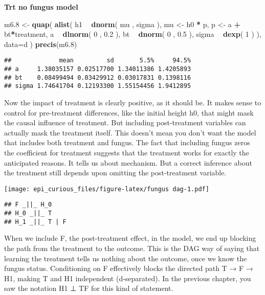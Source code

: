\documentclass[
]{article}
\newenvironment{Shaded}{\begin{snugshade}}{\end{snugshade}}
\newcommand{\DataTypeTok}[1]{\textcolor[rgb]{0.13,0.29,0.53}{#1}}
\newcommand{\DecValTok}[1]{\textcolor[rgb]{0.00,0.00,0.81}{#1}}
\newcommand{\FloatTok}[1]{\textcolor[rgb]{0.00,0.00,0.81}{#1}}
\newcommand{\KeywordTok}[1]{\textcolor[rgb]{0.13,0.29,0.53}{\textbf{#1}}}
\newcommand{\NormalTok}[1]{#1}
\newcommand{\OperatorTok}[1]{\textcolor[rgb]{0.81,0.36,0.00}{\textbf{#1}}}
\newcommand{\StringTok}[1]{\textcolor[rgb]{0.31,0.60,0.02}{#1}}
\begin{document}
\textbf{Trt no fungus model}

\begin{Shaded}
\begin{Highlighting}[]
\NormalTok{m6}\FloatTok{.8}\NormalTok{ <-}\StringTok{ }\KeywordTok{quap}\NormalTok{( }\KeywordTok{alist}\NormalTok{(}
\NormalTok{h1 }\OperatorTok{~}\StringTok{ }\KeywordTok{dnorm}\NormalTok{( mu , sigma ), }
\NormalTok{mu <-}\StringTok{ }\NormalTok{h0 }\OperatorTok{*}\StringTok{ }\NormalTok{p,}
\NormalTok{p <-}\StringTok{ }\NormalTok{a }\OperatorTok{+}\StringTok{ }\NormalTok{bt}\OperatorTok{*}\NormalTok{treatment,}
\NormalTok{a }\OperatorTok{~}\StringTok{ }\KeywordTok{dlnorm}\NormalTok{( }\DecValTok{0}\NormalTok{ , }\FloatTok{0.2}\NormalTok{ ), }
\NormalTok{bt }\OperatorTok{~}\StringTok{ }\KeywordTok{dnorm}\NormalTok{( }\DecValTok{0}\NormalTok{ , }\FloatTok{0.5}\NormalTok{ ), }
\NormalTok{sigma }\OperatorTok{~}\StringTok{ }\KeywordTok{dexp}\NormalTok{( }\DecValTok{1}\NormalTok{ )}
\NormalTok{), }\DataTypeTok{data=}\NormalTok{d ) }
\KeywordTok{precis}\NormalTok{(m6}\FloatTok{.8}\NormalTok{)}
\end{Highlighting}
\end{Shaded}

\begin{verbatim}
##             mean         sd       5.5%     94.5%
## a     1.38035157 0.02517700 1.34011386 1.4205893
## bt    0.08499494 0.03429912 0.03017831 0.1398116
## sigma 1.74641704 0.12193300 1.55154456 1.9412895
\end{verbatim}

Now the impact of treatment is clearly positive, as it should be. It
makes sense to control for pre-treatment differences, like the initial
height h0, that might mask the causal influence of treatment. But
including post-treatment variables can actually mask the treatment
itself. This doesn't mean you don't want the model that includes both
treatment and fungus. The fact that including fungus zeros the
coefficient for treatment suggests that the treatment works for exactly
the anticipated reasons. It tells us about mechanism. But a correct
inference about the treatment still depends upon omitting the
post-treatment variable.

\texttt{[image: epi\_curious\_files/figure-latex/fungus dag-1.pdf]}

\begin{verbatim}
## F _||_ H_0
## H_0 _||_ T
## H_1 _||_ T | F
\end{verbatim}

When we include F, the post-treatment effect, in the model, we end up
blocking the path from the treatment to the outcome. This is the DAG way
of saying that learning the treatment tells us nothing about the
outcome, once we know the fungus status. Conditioning on F effectively
blocks the directed path T → F → H1, making T and H1 independent
(d-separated). In the previous chapter, you saw the notation H1 ⊥
T\textbar F for this kind of statement.
\end{document}
